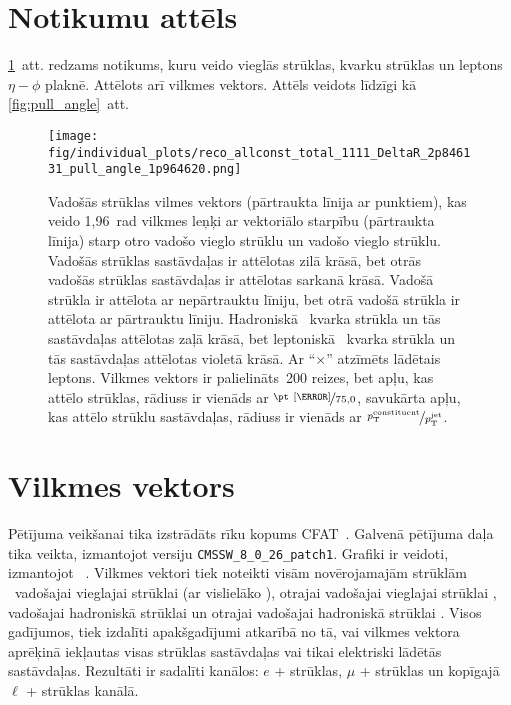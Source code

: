 \label{chap:results}
\section{Notikumu attēls}
\ref{fig:event_display}~att. redzams notikums, kuru veido vieglās strūklas, \cPqb kvarku strūklas un leptons $\eta-\phi$ plaknē. Attēlots arī vilkmes vektors. Attēls veidots līdzīgi kā \ref{fig:pull_angle}~att.

\begin{figure}[hbtp]
  \centering
  \texttt{[image: fig/individual\_plots/reco\_allconst\_total\_1111\_DeltaR\_2p846131\_pull\_angle\_1p964620.png]}
  \caption{Vadošās strūklas vilmes vektors (pārtraukta līnija ar punktiem), kas veido 1,96~rad vilkmes leņķi ar vektoriālo starpību (pārtraukta līnija) starp otro vadošo vieglo strūklu un vadošo vieglo strūklu. Vadošās strūklas sastāvdaļas ir attēlotas zilā krāsā, bet otrās vadošās strūklas sastāvdaļas ir attēlotas sarkanā krāsā. Vadošā strūkla ir attēlota ar nepārtrauktu līniju, bet otrā vadošā strūkla ir attēlota ar pārtrauktu līniju. Hadroniskā \cPqb~kvarka strūkla un tās sastāvdaļas attēlotas zaļā krāsā, bet leptoniskā \cPqb~kvarka strūkla un tās sastāvdaļas attēlotas violetā krāsā. Ar ``$\times$'' atzīmēts lādētais leptons. Vilkmes vektors ir palielināts~200 reizes, bet apļu, kas attēlo strūklas, rādiuss ir vienāds ar $\nicefrac{\pt~[\GeV]}{75,0}$, savukārta apļu, kas attēlo strūklu sastāvdaļas, rādiuss ir vienāds ar $\nicefrac{p^{\text{constituent}}_{\text{T}}}{p^{\text{jet}}_{\text{T}}}$.}
  \label{fig:event_display}
\end{figure}

\section{Vilkmes vektors}

Pētījuma veikšanai tika izstrādāts rīku kopums \textsc{CFAT}~\cite{url:cfat}. Galvenā pētījuma daļa tika veikta, izmantojot \CMSSW versiju \lstinline[language=sh]|CMSSW_8_0_26_patch1|. Grafiki ir veidoti, izmantojot \ROOT~\cite{Brun}. Vilkmes vektori tiek noteikti visām novērojamajām strūklām \textendash\ vadošajai vieglajai strūklai \leadingjet (ar vislielāko \pt), otrajai vadošajai vieglajai strūklai \scndleadingjet, vadošajai hadroniskā \cPqb strūklai \leadingb un otrajai vadošajai hadroniskā \cPqb strūklai \scndleadingb. Visos gadījumos, tiek izdalīti apakšgadījumi atkarībā no tā, vai vilkmes vektora aprēķinā iekļautas visas strūklas sastāvdaļas vai tikai elektriski lādētās sastāvdaļas. Rezultāti ir sadalīti kanālos: $e$ + strūklas, $\mu$ + strūklas un kopīgajā $\ell$ + strūklas kanālā.

